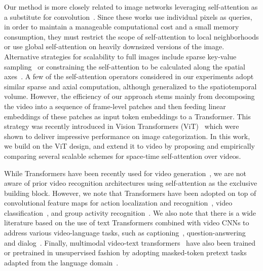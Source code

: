 \documentclass{article}
\begin{document}
Our method is more closely related to image networks leveraging self-attention as a substitute for convolution~\cite{Parmar:ICML2018, Ramachandran:NeurIPS2019, Cordonnier:ICLR2020, Zhao:CVPR2020}. Since these works use individual pixels as queries, in order to maintain a manageable computational cost and a small memory consumption, they must restrict the scope of self-attention to local neighborhoods or use global self-attention on heavily downsized versions of the image. Alternative strategies for scalability to full images include sparse key-value sampling~\cite{Child:OpenAI} or constraining the self-attention to be calculated along the spatial axes~\cite{Ho:Axial, huang2018ccnet, Wang:Axial}. A few of the self-attention operators considered in our experiments adopt similar sparse and axial computation, although generalized to the spatiotemporal volume. However, the efficiency of our approach stems mainly from decomposing the video into a sequence of frame-level patches and then feeding linear embeddings of these patches as input token embeddings to a Transformer. This strategy was recently introduced in Vision Transformers (ViT)~\cite{Dosovitskiy:ICLR2021} which were shown to deliver impressive performance on image categorization. In this work, we build on the ViT design, and extend it to video by proposing and empirically comparing several scalable schemes for space-time self-attention over videos.















While Transformers have been recently used for video generation~\cite{Weissenborn:ICLR2020}, we are not aware of prior video recognition architectures using self-attention as the exclusive building block. However, we note that Transformers have been adopted on top of convolutional feature maps for action localization and recognition~\cite{ActionTransformer}, video classification~\cite{NLN, doubleattention},  and group activity recognition~\cite{Gavrilyuk:CVPR2020}. We also note that there is a wide literature based on the use of text Transformers combined with video CNNs to address various video-language tasks, such as captioning~\cite{zhou2018end}, question-answering~\cite{yang2020bert} and dialog~\cite{le2019multimodal}. Finally, multimodal video-text transformers~\cite{VideoBERT, li2020hero} have also been trained or pretrained in unsupervised fashion by adopting masked-token pretext tasks adapted from the language domain~\cite{BERT,radford2018improving}. 
\end{document}
